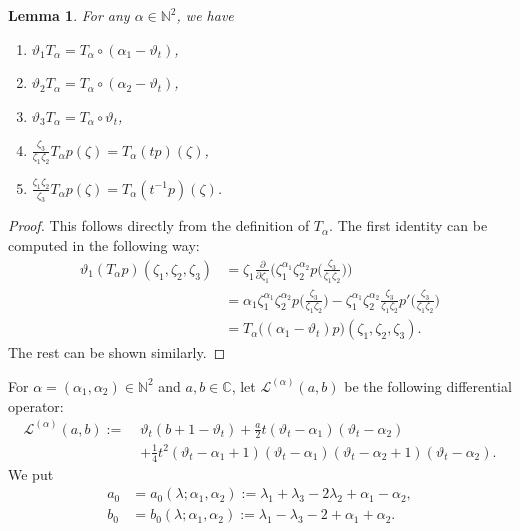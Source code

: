 \documentclass[a4paper,11pt,reqno]{amsart}
\newcommand{\CC}{\mathbb{C}}
\newcommand{\NN}{\mathbb{N}}
\newcommand{\calL}{\mathcal{L}}
\newcommand{\0}{{\bf 0}}
\newcommand{\1}{{\bf 1}}
\theoremstyle{plain}
\newtheorem{lemma}[equation]{Lemma}
\theoremstyle{definition}
\numberwithin{equation}{section}
\theoremstyle{definition}
\begin{document}
\begin{lemma}\label{lem:T-saturation}
For any $\alpha\in \NN^2$, we have
\begin{enumerate}[label=\normalfont{(\arabic*)}]
    \item $\vartheta_1T_\alpha=T_\alpha \circ (\alpha_1-\vartheta_t)$,
    \vspace{3pt}
    \item $\vartheta_2T_\alpha=T_\alpha \circ (\alpha_2-\vartheta_t)$,
    \vspace{3pt}
    \item $\vartheta_3T_\alpha=T_\alpha \circ\vartheta_t$,
    \vspace{3pt}
    \item $\frac{\zeta_3}{\zeta_1\zeta_2}T_\alpha p(\zeta)=T_\alpha (tp)(\zeta)$,
    \vspace{3pt}
    \item $\frac{\zeta_1\zeta_2}{\zeta_3}T_\alpha p(\zeta)=T_\alpha(t^{-1}p)(\zeta)$.    
\end{enumerate}
\end{lemma}
\begin{proof}
This follows directly from the definition of $T_\alpha$. The first identity can be computed in the following way:
\begin{align*}
\vartheta_1 (T_\alpha p)(\zeta_1,\zeta_2,\zeta_3)&=\zeta_1\frac{\partial}{\partial\zeta_1}\Big( \zeta_1^{\alpha_1}\zeta_2^{\alpha_2}p\Big(\frac{\zeta_3}{\zeta_1\zeta_2}\Big)\Big)\\
&=\alpha_1\zeta_1^{\alpha_1}\zeta_2^{\alpha_2}p\Big(\frac{\zeta_3}{\zeta_1\zeta_2}\Big)-\zeta_1^{\alpha_1}\zeta_2^{\alpha_2}\frac{\zeta_3}{\zeta_1\zeta_2}p'\Big(\frac{\zeta_3}{\zeta_1\zeta_2}\Big)\\
&=T_\alpha\big((\alpha_1-\vartheta_t)p\big)(\zeta_1,\zeta_2,\zeta_3).
\end{align*}
The rest can be shown similarly.
\end{proof}


For $\alpha=(\alpha_1,\alpha_2)\in \NN^2$ and $a,b\in \CC$, 
let $\calL^{(\alpha)}(a,b)$ be the following differential operator:
\begin{align}
\calL^{(\alpha)}(a,b) 
:= \; &\vartheta_t(b+1-\vartheta_t)+\frac{a}{2}t(\vartheta_t-\alpha_1)
(\vartheta_t-\alpha_2) \nonumber \\
\enspace &+\frac{1}{4}t^2(\vartheta_t-\alpha_1+1)
(\vartheta_t-\alpha_1)(\vartheta_t-\alpha_2+1)(\vartheta_t-\alpha_2).\label{eqn:Lalpha}\end{align}
We put
\begin{equation}\label{eqn:ab}
\begin{aligned}
a_0&=a_0(\lambda;\alpha_1,\alpha_2):= \lambda_1+\lambda_3-2\lambda_2+\alpha_1-\alpha_2, \\[3pt]
b_0&=b_0(\lambda;\alpha_1,\alpha_2):= \lambda_1-\lambda_3-2+\alpha_1+\alpha_2.
\end{aligned}
\end{equation} 
\end{document}
